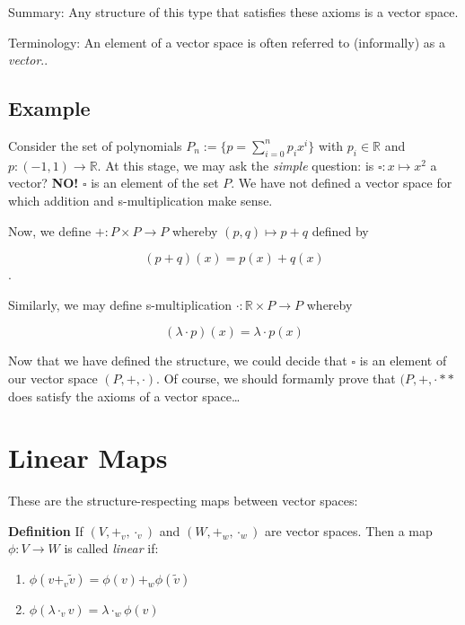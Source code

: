 \documentclass[
  letterpaper,
  DIV=11,
  numbers=noendperiod,
  oneside]{scrreprt}
\providecommand{\tightlist}{%
  \setlength{\itemsep}{0pt}\setlength{\parskip}{0pt}}\usepackage{longtable,booktabs,array}
\begin{document}
Summary: Any structure of this type that satisfies these axioms is a
vector space.

Terminology: An element of a vector space is often referred to
(informally) as a \emph{vector}..

\hypertarget{example}{%
\subsection{Example}\label{example}}

Consider the set of polynomials \(P_n := \{p=\sum_{i=0}^{n}p_ix^i\}\)
with \(p_i\in \mathbb{R}\) and \(p:(-1,1)\to\mathbb{R}\). At this stage,
we may ask the \emph{simple} question: is \(\square:x\mapsto x^2\) a
vector? \textbf{NO!} \(\square\) is an element of the set \(P\). We have
not defined a vector space for which addition and s-multiplication make
sense.

Now, we define \(+:P\times P \to P\) whereby \((p,q) \mapsto p+q\)
defined by

\[(p+q)(x) = p(x) + q(x)\].

Similarly, we may define s-multiplication
\(\cdot: \mathbb{R}\times P \to P\) whereby

\[ (\lambda \cdot p)(x) = \lambda \cdot p(x) \]

Now that we have defined the structure, we could decide that \(\square\)
is an element of our vector space \((P, +, \cdot)\). Of course, we
should formamly prove that \((P, +, \cdot**\) does satisfy the axioms of
a vector space\ldots{}

\hypertarget{linear-maps}{%
\section{Linear Maps}\label{linear-maps}}

These are the structure-respecting maps between vector spaces:

\textbf{Definition} If \((V, +_v, \cdot_v)\) and \((W, +_w, \cdot_w)\)
are vector spaces. Then a map \(\phi:V\to W\) is called \emph{linear}
if:

\begin{enumerate}
\def\labelenumi{\arabic{enumi}.}
\tightlist
\item
  \(\phi(v+_v\tilde{v}) = \phi(v) +_w \phi(\tilde v)\)
\item
  \(\phi(\lambda \cdot_v v) = \lambda \cdot_w \phi(v)\)
\end{enumerate}
\end{document}
